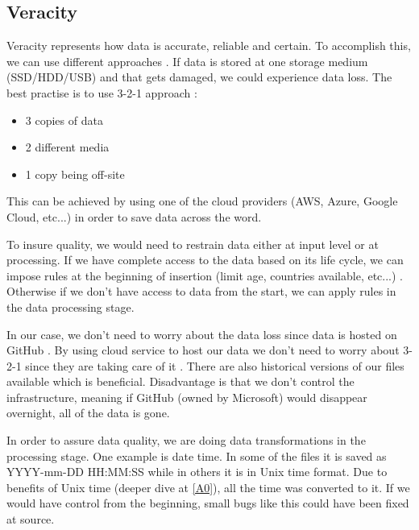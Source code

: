\subsection{Veracity}\label{Veracity}
Veracity represents how data is accurate, reliable and certain. To accomplish this, we can use different approaches \parencite{rubin2013veracity}. If data is stored at one storage medium (SSD/HDD/USB) and that gets damaged, we could experience data loss. The best practise is to use 3-2-1 approach \parencite{storage2012data}:
\begin{itemize}
    \item 3 copies of data
    \item 2 different media
    \item 1 copy being off-site
\end{itemize}
This can be achieved by using one of the cloud providers (AWS, Azure, Google Cloud, etc...) in order to save data across the word.

To insure quality, we would need to restrain data either at input level or at processing. If we have complete access to the data based on its life cycle, we can impose rules at the beginning of insertion (limit age, countries available, etc...) \parencite{yu2010view}. Otherwise if we don't have access to data from the start, we can apply rules in the data processing stage.

In our case, we don't need to worry about the data loss since data is hosted on GitHub \parencite{web:GitHub}. By using cloud service to host our data we don't need to worry about 3-2-1 since they are taking care of it \parencite{wang2010toward}. There are also historical versions of our files available which is beneficial. Disadvantage is that we don't control the infrastructure, meaning if GitHub (owned by Microsoft) would disappear overnight, all of the data is gone.

In order to assure data quality, we are doing data transformations in the processing stage. One example is date time. In some of the files it is saved as YYYY-mm-DD HH:MM:SS while in others it is in Unix time format. Due to benefits of Unix time (deeper dive at \ref{A0}), all the time was converted to it. If we would have control from the beginning, small bugs like this could have been fixed at source.